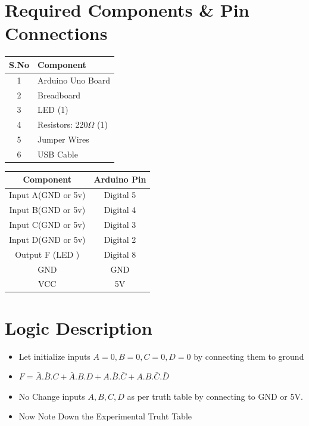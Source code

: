 \documentclass[a4paper,12pt]{article}
\begin{document}
\section*{Required Components \& Pin Connections}
\begin{center}
\begin{minipage}{0.45\textwidth}
\begin{table}[H]
\centering
\begin{tabular}{|c|l|}
\hline
\textbf{S.No} & \textbf{Component} \\ \hline
1 & Arduino Uno Board \\
2 & Breadboard \\
3 & LED (1) \\
4 & Resistors: 220$\Omega$ (1) \\
5 & Jumper Wires \\
6 & USB Cable \\
\hline
\end{tabular}
\end{table}
\end{minipage}
\hspace{0.05\textwidth}
\begin{minipage}{0.45\textwidth}
\begin{table}[H]
\centering
\begin{tabular}{|c|c|}
\hline
\textbf{Component} & \textbf{Arduino Pin} \\ \hline
Input A(GND or 5v) & Digital 5 \\
Input B(GND or 5v) & Digital 4 \\
Input C(GND or 5v) & Digital 3 \\
Input D(GND or 5v) & Digital 2 \\
Output F (LED ) & Digital 8 \\
GND & GND \\
VCC & 5V \\
\hline
\end{tabular}
\end{table}
\end{minipage}
\end{center}
\section*{Logic Description}
\begin{itemize}
        \item Let initialize inputs $A=0,B=0,C=0,D=0$ by connecting them to ground
        \item $F = \bar{A}.\bar{B}.C + \bar{A}.B.D + A.\bar{B}.\bar{C} + A.B.\bar{C}.\bar{D} $
	\item No Change inputs $A,B,C,D$ as per truth table by connecting to GND or 5V.
	\item Now Note Down the Experimental Truht Table
\end{itemize}
\end{document}
